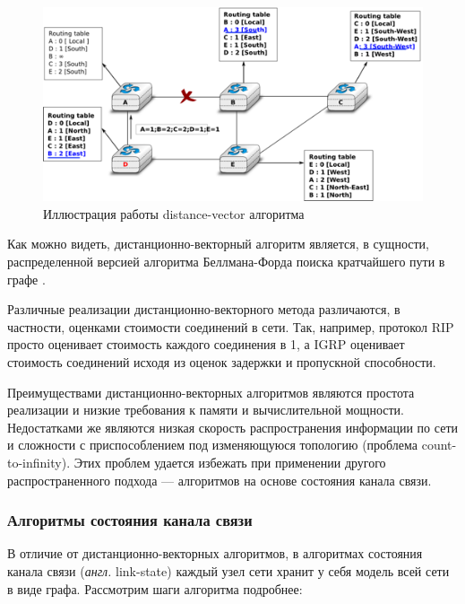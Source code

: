\documentclass[specification,annotation,times]{itmo-student-thesis}
\theoremstyle{definition}
\begin{document}
\begin{figure}[!h]
  \caption{Иллюстрация работы distance-vector алгоритма}\label{rip-img}
  \centering
  \includegraphics[scale=1.5]{dv-failure-2}
\end{figure}

Как можно видеть, дистанционно-векторный алгоритм является, в сущности,
распределенной версией алгоритма Беллмана-Форда поиска кратчайшего пути в
графе \cite{bellman-ford}.

Различные реализации дистанционно-векторного метода различаются, в частности,
оценками стоимости соединений в сети. Так, например, протокол RIP \cite{rip-rfc} просто
оценивает стоимость каждого соединения в 1, а IGRP \cite{igrp-patent} оценивает
стоимость соединений исходя из оценок задержки и пропускной способности.

Преимуществами дистанционно-векторных алгоритмов являются простота реализации и
низкие требования к памяти и вычислительной мощности. Недостатками же являются
низкая скорость распространения информации по сети и сложности с приспособлением
под изменяющуюся топологию (проблема count-to-infinity). Этих проблем
удается избежать при применении другого распространенного подхода --- алгоритмов
на основе состояния канала связи. 

\subsubsection{Алгоритмы состояния канала связи}\label{overview:link-state}

В отличие от дистанционно-векторных алгоритмов, в алгоритмах состояния канала связи
(\textit{англ.} link-state) каждый узел сети хранит у себя модель всей сети в
виде графа. Рассмотрим шаги алгоритма подробнее:
\end{document}
